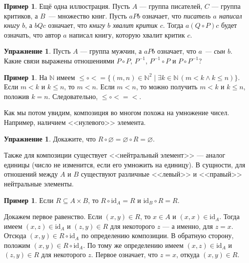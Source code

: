 \documentclass[12pt,notitlepage]{article}
\theoremstyle{plain}
\theoremstyle{definition}
\newtheorem{exc}[thm]{Упражнение}
\newtheorem{exm}[thm]{Пример}
\theoremstyle{plain}
\newcommand{\N}{\mathbb{N}}
\newcommand{\sbs}{\subseteq}
\newcommand{\void}{\varnothing}
\newcommand{\id}{\mathrm{id}}
\newcommand{\1}{\mathbf{1}}
\newcommand{\0}{\mathbf{0}}
\begin{document}
\begin{exm} Ещё одна иллюстрация. Пусть $A$ --- группа писателей, $C$ --- группа критиков, а $B$~--- множество книг. Пусть $a P b$ означает, что \emph{писатель $a$ написал книгу $b$}, а $b Q c$ означает, что \emph{книгу $b$ хвалит критик $c$}. Тогда  $a (Q \circ P) c$ будет означать, что автор $a$ написал книгу, которую хвалит критик $c$.
\end{exm}

\begin{exc}
	Пусть $A$ --- группа мужчин, а $a P b$ означает, что \emph{$a$ --- сын $b$}. Какие связи выражены отношениями $P\circ P$, $P^{-1}$, $P^{-1} \circ P$ и $P \circ P^{-1}$?
\end{exc}

\begin{exm}
	На $\N$ имеем ${\leq}\circ{<} = \{(m,  n) \in \N^2 \mid \exists k\in \N\, (m < k \wedge k \leq n)\}$. Если $m < k$ и $k \leq n$, то $m < n$. Если $m < n$, то можно получить $m < k$ и $k \leq n$, положив $k = n$. Следовательно, ${\leq}\circ{<} = {<}$.
\end{exm}

Как мы потом увидим, композиция во многом похожа на умножение чисел. Например, наличием <<нулевого>> элемента.
\begin{exc}
	Докажите, что $R \circ \void = \void \circ R = \void$.
\end{exc}

Также для композиции существует <<нейтральный элемент>> --- аналог единицы (число не изменится, если его умножить на единицу). В сущности, для отношений между $A$ и $B$ существуют различные <<левый>> и <<правый>> нейтральные элементы.
\begin{exm}
	Если $R \sbs A \times B$, то $R \circ \id_A = R$ и $\id_B \circ R = R$.
	
	Докажем первое равенство. Если $(x,y) \in R$, то $x \in A$ и $(x,x) \in \id_A$. Тогда имеем $(x,z) \in \id_A$ и $(z,y) \in R$ для некоторого $z$ --- а именно, для $z = x$. Отсюда $(x,y) \in R \circ \id_A$ по определению композиции. В обратную сторону, положим $(x,y) \in R \circ \id_A$. По тому же определению имеем $(x,z) \in \id_A$ и $(z,y) \in R$ для некоторого $z$. Первое означает, что $z = x$, откуда $(x,y) \in R$.
\end{exm}
\end{document}
